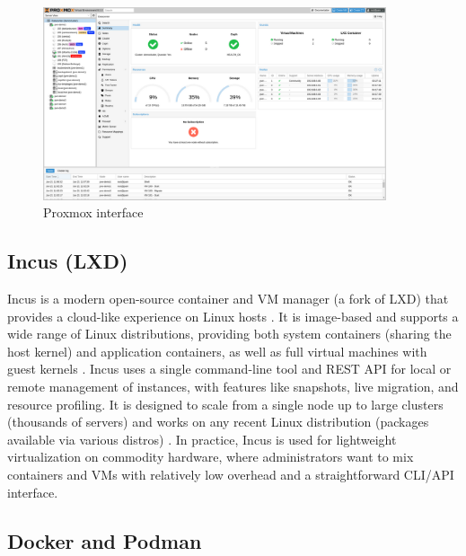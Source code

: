 \begin{figure}[H]
  \centering
  \includegraphics[width=0.9\textwidth]{imaxes/proxmox-ui.png}
  \caption{Proxmox interface}
  \label{fig:proxmox-ui}
\end{figure}

\subsection*{Incus (LXD)}

Incus is a modern open-source container and VM manager (a fork of LXD) that provides a cloud-like experience on Linux hosts \cite{incus-linux-containers-2023}. It is image-based and supports a wide range of Linux distributions, providing both system containers (sharing the host kernel) and application containers, as well as full virtual machines with guest kernels . Incus uses a single command-line tool and REST API for local or remote management of instances, with features like snapshots, live migration, and resource profiling. It is designed to scale from a single node up to large clusters (thousands of servers)  and works on any recent Linux distribution (packages available via various distros) . In practice, Incus is used for lightweight virtualization on commodity hardware, where administrators want to mix containers and VMs with relatively low overhead and a straightforward CLI/API interface.

\subsection*{Docker and Podman}

